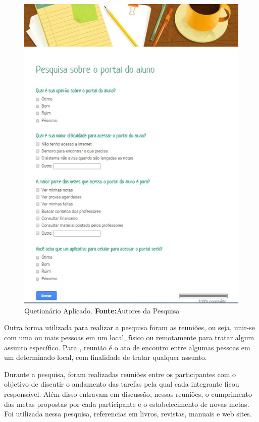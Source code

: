\begin{figure}[h!]
	\centerline{\includegraphics[scale=0.5]{./imagens/imagem4.png}}
	\caption[Quetionário Aplicado]{Quetionário Aplicado.
	 \textbf{Fonte:}Autores da Pesquisa}
	\label{fig:exemplo4}
\end{figure}

\pagebreak

	\par Outra forma utilizada para realizar a pesquisa foram as reuniões, ou seja,
unir-se com uma ou mais pessoas em um local, físico ou remotamente para tratar
algum assunto específico. Para , reunião é o ato
de encontro entre algumas pessoas em um determinado local, com finalidade de tratar
qualquer assunto.

	\par Durante a pesquisa, foram realizadas reuniões entre os participantes com o
objetivo de discutir o andamento das tarefas pela qual cada integrante ficou
responsável. Além disso entravam em discussão, nessas reuniões, o cumprimento
das metas propostas por cada participante e o estabelecimento de novas metas.
Foi utilizada nessa pesquisa, referencias em livros, revistas, manuais e web
sites.


